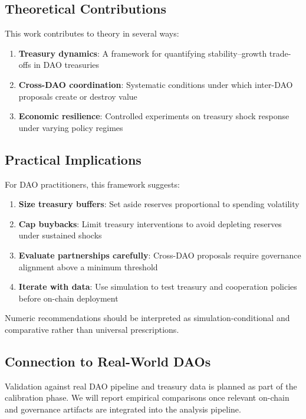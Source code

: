 \subsection{Theoretical Contributions}

This work contributes to theory in several ways:

\begin{enumerate}
    \item \textbf{Treasury dynamics}: A framework for quantifying stability--growth trade-offs in DAO treasuries
    \item \textbf{Cross-DAO coordination}: Systematic conditions under which inter-DAO proposals create or destroy value
    \item \textbf{Economic resilience}: Controlled experiments on treasury shock response under varying policy regimes
\end{enumerate}

\subsection{Practical Implications}

For DAO practitioners, this framework suggests:

\begin{enumerate}
    \item \textbf{Size treasury buffers}: Set aside reserves proportional to spending volatility
    \item \textbf{Cap buybacks}: Limit treasury interventions to avoid depleting reserves under sustained shocks
    \item \textbf{Evaluate partnerships carefully}: Cross-DAO proposals require governance alignment above a minimum threshold
    \item \textbf{Iterate with data}: Use simulation to test treasury and cooperation policies before on-chain deployment
\end{enumerate}

\noindent
Numeric recommendations should be interpreted as simulation-conditional and comparative rather than universal prescriptions.

\subsection{Connection to Real-World DAOs}

Validation against real DAO pipeline and treasury data is planned as part of the calibration phase. We will report empirical comparisons once relevant on-chain and governance artifacts are integrated into the analysis pipeline.
